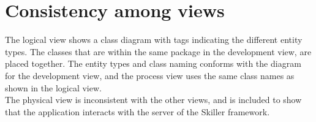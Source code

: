 \section{Consistency among views}
The logical view shows a class diagram with tags indicating the different entity types. The classes that are within the same package in the development view,  are placed together. The entity types and class naming conforms with the diagram for the development view, and the process view uses the same class names as shown in the logical view. \\

The physical view is inconsistent with the other views, and is included to show that the application interacts with the server of the Skiller framework.




